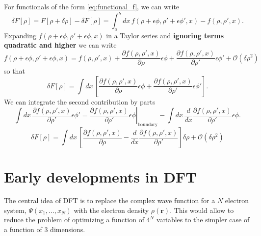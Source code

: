\documentclass[../Main/chem532-notes.tex]{subfiles}
\begin{document}
For functionals of the form \eqref{eq:functional_f}, we can write
\begin{equation}
\delta F[\rho]  = F[\rho + \delta\rho] - \delta F[\rho] =  \int_a^b dx\, f(\rho + \epsilon \phi, \rho' + \epsilon \phi', x) - f(\rho,\rho',x).
\end{equation}
Expanding $f(\rho + \epsilon \phi, \rho' + \epsilon \phi, x)$ in a Taylor series and \textbf{ignoring terms quadratic and higher} we can write
\begin{equation}
f(\rho + \epsilon \phi, \rho' + \epsilon \phi, x) = f(\rho,\rho',x) + \frac{\partial f(\rho,\rho',x)}{\partial \rho} \epsilon \phi + \frac{\partial f(\rho,\rho',x)}{\partial \rho'} \epsilon \phi'
+ \mathcal{O}(\delta\rho^2)
\end{equation}
so that
\begin{equation}
\delta F[\rho] = \int dx \, \left[ \frac{\partial f(\rho,\rho',x)}{\partial \rho} \epsilon \phi + \frac{\partial f(\rho,\rho',x)}{\partial \rho'} \epsilon \phi' \right].
\end{equation}
We can integrate the second contribution by parts
\begin{equation}
\int dx \, \frac{\partial f(\rho,\rho',x)}{\partial \rho'} \epsilon \phi' = \left. \frac{\partial f(\rho,\rho',x)}{\partial \rho'} \epsilon \phi \right|_\text{boundary} - \int dx \, \frac{d}{dx} \frac{\partial f(\rho,\rho',x)}{\partial \rho'} \epsilon \phi.
\end{equation}
\begin{equation}
\delta F[\rho] = \int dx \, \left[ \frac{\partial f(\rho,\rho',x)}{\partial \rho} - \frac{d}{dx} \frac{\partial f(\rho,\rho',x)}{\partial \rho'} \right] \delta\rho + \mathcal{O}(\delta\rho^2)
\end{equation}

\section{Early developments in DFT}
The central idea of DFT is to replace the complex wave function for a $N$ electron system, $\Psi(x_1,\ldots,x_N)$ with the electron density $\rho(\mathbf{r})$.
This would allow to reduce the problem of optimizing a function of $4^N$ variables to the simpler case of a function of 3 dimensions.
\end{document}
